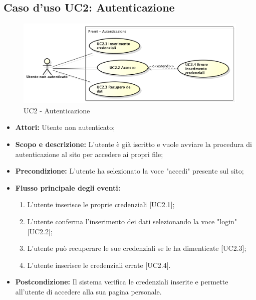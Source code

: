 \subsection{Caso d'uso UC2: Autenticazione}
\begin{figure}[h] 
	\centering 
	\includegraphics[scale=0.45] {img/UC2.png}
	\caption{UC2 - Autenticazione} 
\end{figure}

\begin{itemize}
	\item \textbf{Attori:} Utente non autenticato;
	\item \textbf{Scopo e descrizione:} L'utente è già iscritto e vuole avviare la procedura di autenticazione al sito per accedere ai propri file;
	\item \textbf{Precondizione:} L'utente ha selezionato la voce "accedi" presente sul sito;
	\item \textbf{Flusso principale degli eventi:}
	\begin{enumerate}
		\item L'utente inserisce le proprie credenziali [UC2.1];
		\item L'utente conferma l'inserimento dei dati selezionando la voce "login" [UC2.2];
		\item L'utente può recuperare le sue credenziali se le ha dimenticate [UC2.3];
		\item L'utente inserisce le credenziali errate [UC2.4].
	\end{enumerate}
	\item \textbf{Postcondizione:} Il sistema verifica le credenziali inserite e permette all'utente di accedere alla sua pagina personale.
\end{itemize}

